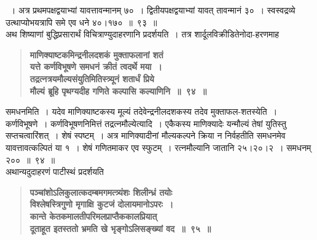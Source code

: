 \documentclass[11pt, openany]{book}
\begin{document}
\newpage

\begin{sloppypar}
~। अत्र प्रथमपक्षद्वयाभ्यां यावत्तावन्मानम् ७०~। द्वितीयपक्षद्वयाभ्यां यावत् तावन्मानं ३०~। स्वस्वद्रव्ये उत्थाप्योभयत्रापि समे एव धने ४०।१७०~॥~९३~॥\\

{\small अथ शिष्याणां बुद्धिप्रसारार्थं विचित्राण्युदाहरणानि प्रदर्शयति~। तत्र शार्दूलविक्रीडितेनोदा-हरणमाह\textendash }

 \label{7.94}
\begin{quote}
{\large \textbf{{\color{purple}माणिक्याष्टकमिन्द्रनीलदशकं मुक्ताफलानां शतं\\
यत्ते कर्णविभूषणे समधनं क्रीतं त्वदर्थे मया~।\\
तद्रत्नत्रयमौल्यसंयुतिमितिस्त्र्यूनं शतार्धं प्रिये\\
मौल्यं ब्रूहि पृथग्यदीह गणिते कल्पासि कल्याणिनि~॥~९४~॥}}}
\end{quote}

समधनमिति~। यदेव माणिक्याष्टकस्य मूल्यं तदेवेन्द्रनीलदशकस्य तदेव मुक्ताफल-शतस्येति~। कर्णविभूषणे~। कर्णविभूषणनिमित्तं तद्रत्नमौल्येत्यादि~। एकैकस्य माणिक्यादेः यन्मौल्यं तेषां युतिस्तु सप्तचत्वारिंशत्~। शेषं स्पष्टम्~। अत्र माणिक्यादीनां मौल्यकल्पने क्रिया न निर्वहतीति समधनमेव यावत्तावत्कल्पितं या १~। शेषं गणितमाकर एव स्फुटम्~। रत्नमौल्यानि जातानि २५।२०।२~। समधनम् २००~॥~९४~॥\\

{\small अथान्यदुदाहरणं पाटीस्थं प्रदर्शयति\textendash }

 \label{7.95}
\begin{quote}
{\large \textbf{{\color{purple}पञ्चांशोऽलिकुलात्कदम्बमगमत्त्र्यंशः शिलीन्ध्रं तयोः\\
विश्लेषस्त्रिगुणो मृगाक्षि कुटजं दोलायमानोऽपरः~।\\
कान्ते केतकमालतीपरिमलप्राप्तैककालप्रियात्\\
दूताहूत इतस्ततो भ्रमति खे भृङ्गोऽलिसङ्ख्यां वद~॥~९५~॥}}}
\end{quote}


\end{sloppypar}
\end{document}
